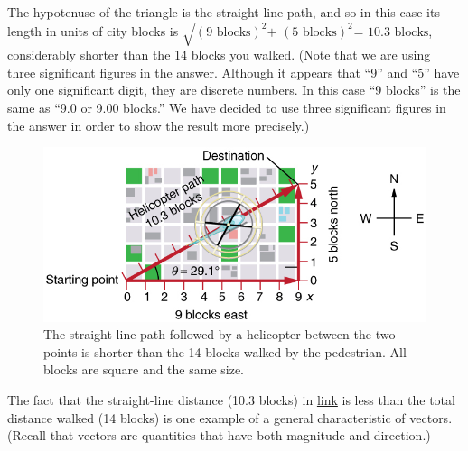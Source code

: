 \documentclass[
]{book}
\begin{document}
The hypotenuse of the triangle is the straight-line path, and so in this
case its length in units of city blocks is
\({\sqrt{(\text{9\ blocks})^{2}\text{+~}(\text{5\ blocks})^{2}}\text{=~10}\text{.}\text{3\ blocks}}{}\),
considerably shorter than the 14 blocks you walked. (Note that we are
using three significant figures in the answer. Although it appears that
``9'' and ``5'' have only one significant digit, they are discrete numbers.
In this case ``9 blocks'' is the same as ``9.0 or 9.00 blocks.'' We have
decided to use three significant figures in the answer in order to show
the result more precisely.)

\begin{figure}
\hypertarget{import-auto-id1165298535408}{%
\centering
\includegraphics{images/Figure_03_01_03.jpg}
\caption{The straight-line path followed by a helicopter between the two points
is shorter than the 14 blocks walked by the pedestrian. All blocks are
square and the same
size.}\label{import-auto-id1165298535408}
}
\end{figure}

The fact that the straight-line distance (10.3 blocks) in
\protect\hyperlink{import-auto-id1165298535408}{link} is less
than the total distance walked (14 blocks) is one example of a general
characteristic of vectors. (Recall that
\protect\hypertarget{import-auto-id1165298541000}{}{vectors} are quantities
that have both magnitude and direction.)
\end{document}
